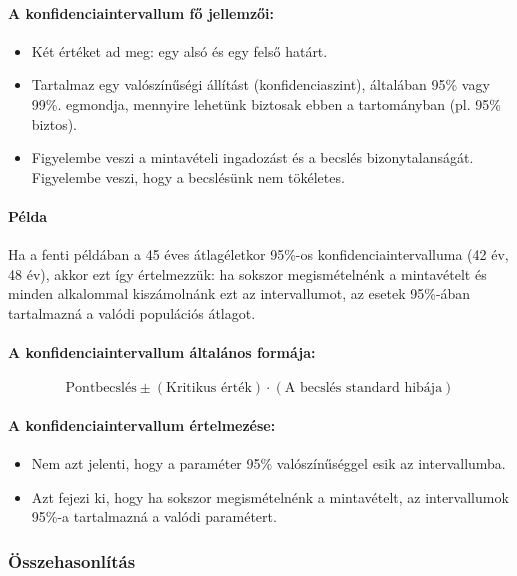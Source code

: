 \documentclass[a4paper,12pt]{article}
\begin{document}
    \paragraph{A konfidenciaintervallum fő jellemzői:}
    \begin{itemize}
        \item Két értéket ad meg: egy alsó és egy felső határt.
        \item Tartalmaz egy valószínűségi állítást (konfidenciaszint), általában 95\% vagy 99\%. egmondja, mennyire lehetünk biztosak ebben a tartományban (pl. 95\% biztos).
        \item Figyelembe veszi a mintavételi ingadozást és a becslés bizonytalanságát. Figyelembe veszi, hogy a becslésünk nem tökéletes.
    \end{itemize}

    \paragraph{Példa}
    Ha a fenti példában a 45 éves átlagéletkor 95\%-os konfidenciaintervalluma (42 év, 48 év), akkor ezt így értelmezzük: ha sokszor megismételnénk a mintavételt és minden alkalommal kiszámolnánk ezt az intervallumot, az esetek 95\%-ában tartalmazná a valódi populációs átlagot.

    \paragraph{A konfidenciaintervallum általános formája:}
    \[ \text{Pontbecslés} \pm (\text{Kritikus érték}) \cdot (\text{A becslés standard hibája}) \]

    \paragraph{A konfidenciaintervallum értelmezése:}
    \begin{itemize}
        \item Nem azt jelenti, hogy a paraméter 95\% valószínűséggel esik az intervallumba.
        \item Azt fejezi ki, hogy ha sokszor megismételnénk a mintavételt, az intervallumok 95\%-a tartalmazná a valódi paramétert.
    \end{itemize}

    \subsubsection{Összehasonlítás}
\end{document}
